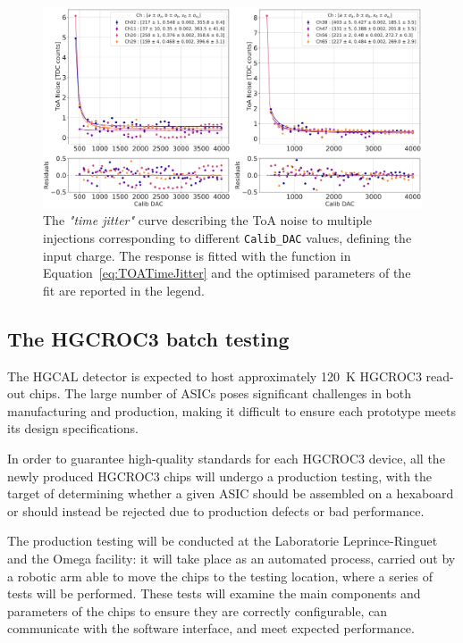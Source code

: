 \begin{figure}
    \centering
    \includegraphics[width=0.75\linewidth]{Figures/HGCAL/ToANoise_Injection.pdf}
    \caption{The \textit{"time jitter"} curve describing the ToA noise to multiple injections corresponding to different \texttt{Calib\_DAC} values, defining the input charge. The  response is fitted with the function in Equation~\ref{eq:TOATimeJitter} and the optimised parameters of the fit are reported in the legend.}
    \label{fig:TOANoise_Injection}
\end{figure}

\subsection{The HGCROC3 batch testing}
\label{subsec:The HGCROC3 batch testing}

The HGCAL detector is expected to host approximately 120~K HGCROC3 read-out chips. The large number of ASICs poses significant challenges in both manufacturing and production, making it difficult to ensure each prototype meets its design specifications.

In order to guarantee high-quality standards for each HGCROC3 device, all the newly produced HGCROC3 chips will undergo a production testing, with the target of determining whether a given ASIC should be assembled on a hexaboard or should instead be rejected due to production defects or bad performance.

The production testing will be conducted at the Laboratorie Leprince-Ringuet and the Omega facility: it will take place as an automated process, carried out by a robotic arm able to move the chips to the testing location, where a series of tests will be performed. 
These tests will examine the main components and parameters of the chips to ensure they are correctly configurable, can communicate with the software interface, and meet expected performance.

\bigbreak

